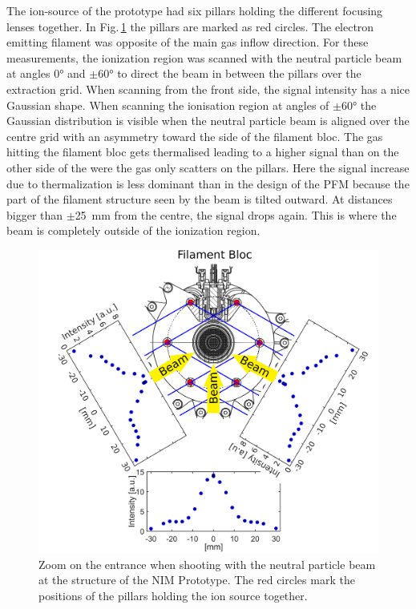 	The ion-source of the prototype had six pillars holding the different focusing lenses together. In Fig.\,\ref{exp:ProtoIntCharEnt} the pillars are marked as red circles. The electron emitting filament was opposite of the main gas inflow direction. For these measurements, the ionization region was scanned with the neutral particle beam at angles 0° and $\pm$60° to direct the beam in between the pillars over the extraction grid. When scanning from the front side, the signal intensity has a nice Gaussian shape. When scanning the ionisation region at angles of $\pm$60° the Gaussian distribution is visible when the neutral particle beam is aligned over the centre grid with an asymmetry toward the side of the filament bloc. The gas hitting the filament bloc gets thermalised leading to a higher signal than on the other side of the were the gas only scatters on the pillars. Here the signal increase due to thermalization is less dominant than in the design of the PFM because the part of the filament structure seen by the beam is tilted outward. At distances bigger than $\pm$25~mm from the centre, the signal drops again. This is where the beam is completely outside of the ionization region.
	\begin{figure}[h!]
		\centering
		\includegraphics[width=\textwidth]{Experiments/Entrence_Proto_topview.png}
		\caption{Zoom on the entrance when shooting with the neutral particle beam at the structure of the NIM Prototype. The red circles mark the positions of the pillars holding the ion source together.}
		\label{exp:ProtoIntCharEnt}
	\end{figure}
	

